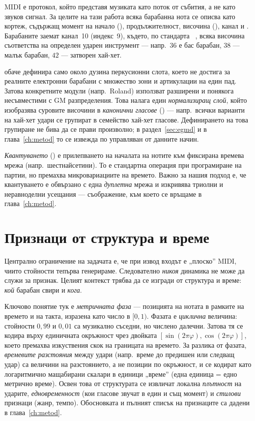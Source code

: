 MIDI е протокол, който представя музиката като поток от събития, а не като
звуков сигнал. За целите на тази работа всяка барабанна нота се описва като
кортеж, съдържащ момент на начало (), продължителност, височина
(), канал и . Барабаните заемат канал~10 (индекс~9),
където, по стандарта ~\cite{gm1991spec}, всяка височина
съответства на определен ударен инструмент — напр.\ $36$ е бас барабан, $38$ —
малък барабан, $42$ — затворен хай-хет.

 обаче дефинира само около дузина перкусионни слота, което не
достига за реалните електронни барабани с множество зони и артикулации на един
пад. Затова конкретните модули (напр.\ Roland) използват разширени и понякога
несъвместими с GM разпределения. Това налага един \emph{нормализиращ слой}, който
изобразява суровите височини в \emph{канонични гласове} () — напр.\
всички варианти на хай-хет удари се групират в семейство хай-хет гласове.
Дефинирането на това групиране не бива да се прави произволно; в
раздел~\ref{sec:egmd} и в глава~\ref{ch:metod} то се извежда по управляван от
данните начин.

\emph{Квантуването} () е прилепването на началата на нотите към
фиксирана времева мрежа (напр.\ шестнайсетини). То е стандартна операция при
програмиране на партии, но премахва микровариациите на времето. Важно за нашия
подход е, че квантуването е обвързано с една \emph{дуплетна} мрежа и изкривява
триолни и неравноделни усещания — съображение, към което се връщаме в
глава~\ref{ch:metod}.

\section{Признаци от структура и време}
\label{sec:priznaci}

Централно ограничение на задачата е, че при извод входът е „плоско'' MIDI, чиито
\eng{velocity} стойности тепърва генерираме. Следователно \emph{никоя} динамика не
може да служи за признак. Целият контекст трябва да се изгради от структура и
време: \emph{кой} барабан свири и \emph{кога}.

Ключово понятие тук е \emph{метричната фаза} — позицията на нотата в рамките на
времето и на такта, изразена като число в $[0,1)$. Фазата е \emph{циклична}
величина: стойности $0{,}99$ и $0{,}01$ са музикално съседни, но числено далечни.
Затова тя се кодира върху единичната окръжност чрез двойката
$[\sin(2\pi\varphi),\cos(2\pi\varphi)]$, което премахва изкуствения скок на
границата на времето. За разлика от фазата, \emph{времевите разстояния} между
удари (напр.\ време до предишен или следващ удар) са величини на разстоянието, а
не позиции по окръжност, и се кодират като логаритмично мащабирани скалари в
единици „време'' (една единица = едно метрично време). Освен това от структурата се извличат локална \emph{плътност}
на ударите, \emph{едновременност} (кои гласове звучат в един и същ момент) и
\emph{стилови} признаци (жанр, темпо). Обосновката и пълният списък на признаците
са дадени в глава~\ref{ch:metod}.

